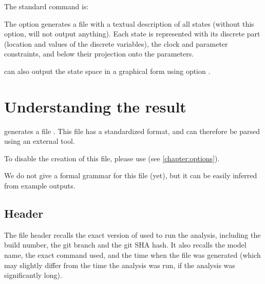 The standard command is:


The option  generates a file with a textual description of all states (without this option, \imitator{} will not output anything).
Each state is represented with its discrete part (location and values of the discrete variables), the clock and parameter constraints, and below their projection onto the parameters.

\imitator{} can also output the state space in a graphical form using option .


\chapter{Understanding the \imitator{} result}\label{chapter:result}

\imitator{} generates a file .
This file has a standardized format, and can therefore be parsed using an external tool.

To disable the creation of this file, please use  (see \cref{chapter:options}).

We do not give a formal grammar for this file (yet), but it can be easily inferred from example outputs.


\section{Header}

The file header recalls the exact version of \imitator{} used to run the analysis, including the build number, the git branch and the git SHA hash.
It also recalls the model name, the exact command used, and the time when the file was generated (which may slightly differ from the time the analysis was run, if the analysis was significantly long).

